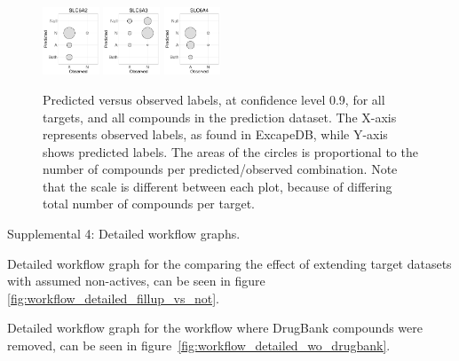 \documentclass[utf8]{frontiersSCNS} %
\begin{document}
\begin{figure}[h!]
\includegraphics[width=0.15\textwidth]{figures/validation_plots/slc6a2_0p9_valplot.pdf}
\includegraphics[width=0.15\textwidth]{figures/validation_plots/slc6a3_0p9_valplot.pdf}
\vspace*{10pt} %
\includegraphics[width=0.15\textwidth]{figures/validation_plots/slc6a4_0p9_valplot.pdf}

    \caption{Predicted versus observed labels, at confidence level 0.9,
    for all targets, and all compounds in the prediction dataset.
    The X-axis represents observed labels, as found in ExcapeDB, while Y-axis
    shows predicted labels. The areas of the circles is proportional to the
    number of compounds per predicted/observed combination. Note that the scale
    is different between each plot, because of differing total number of
    compounds per target.}
    \label{fig:valplots_all_0.9}
\end{figure}

Supplemental 4: Detailed workflow graphs.

Detailed workflow graph for the comparing the effect of extending target
datasets with assumed non-actives, can be seen in figure
\ref{fig:workflow_detailed_fillup_vs_not}.

Detailed workflow graph for the workflow where DrugBank compounds were removed,
can be seen in figure~\ref{fig:workflow_detailed_wo_drugbank}.
\end{document}
